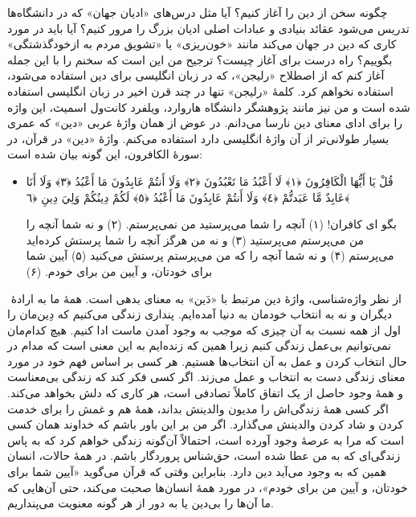 چگونه سخن از دین را آغاز کنیم؟ آیا مثل درس‌های «ادیان جهان» که در دانشگاه‌ها تدریس می‌شود عقائد بنیادی و عبادات اصلی ادیان بزرگ را مرور کنیم؟ آیا باید در مورد کاری که دین در جهان می‌کند مانند «خون‌ریزی» یا «تشویق مردم به ازخودگذشتگی» بگوییم؟ راه درست برای آغاز چیست؟ ترجیح من این است که سخنم را با این جمله آغاز کنم که از اصطلاح «رلیجن»،
که در زبان انگلیسی برای دین استفاده می‌شود، استفاده نخواهم کرد. کلمهٔ «رلیجن» تنها در چند قرن اخیر در زبان انگلیسی استفاده شده است و من نیز مانند پژوهشگر دانشگاه هاروارد، ویلفرد کانت‌ول اسمیث، این واژه را برای ادای معنای دین نارسا می‌دانم. در عوض از همان واژهٔ عربی «دین» که عمری بسیار طولانی‌تر از آن واژهٔ انگلیسی دارد استفاده می‌کنم. واژهٔ «دین» در قرآن، در سورهٔ الکافرون، این گونه بیان شده است:

\begin{itemize}
	\item[]
	
	{
		قُلْ يَا أَيُّهَا الْكَافِرُونَ ﴿١﴾ لَا أَعْبُدُ مَا تَعْبُدُونَ ﴿٢﴾ وَلَا أَنتُمْ عَابِدُونَ مَا أَعْبُدُ ﴿٣﴾ وَلَا أَنَا عَابِدٌ مَّا عَبَدتُّمْ ﴿٤﴾ وَلَا أَنتُمْ عَابِدُونَ مَا أَعْبُدُ ﴿٥﴾ لَكُمْ دِينُكُمْ وَلِيَ دِينِ ﴿٦﴾
	}
	
	{
		بگو ای کافران! (۱) آنچه را شما می‌پرستید من نمی‌پرستم. (۲) و نه شما آنچه را من می‌پرستم می‌پرستید (۳) و نه من هرگز آنچه را شما پرستش کرده‌اید می‌پرستم (۴) و نه شما آنچه را که من می‌پرستم پرستش می‌کنید (۵)  آیین شما برای خودتان، و آیین من برای خودم. (۶)
	}
\end{itemize}
‍‍
از نظر واژه‌شناسی، واژهٔ دین مرتبط با «دَین» به معنای بدهی است. همهٔ ما به ارادهٔ‌ دیگران و نه به انتخاب خودمان به دنیا آمده‌ایم. پنداری زندگی می‌کنیم که دِین‌مان را اول از همه نسبت به آن چیزی که موجب به وجود آمدن ماست ادا کنیم. هیچ کدام‌مان نمی‌توانیم بی‌عمل زندگی کنیم زیرا همین که زنده‌ایم به این معنی است که مدام در حال انتخاب کردن و عمل به آن انتخاب‌ها هستیم. هر کسی بر اساس فهم خود در مورد معنای زندگی دست به انتخاب و عمل می‌زند. اگر کسی فکر کند که زندگی بی‌معناست و همهٔ‌ وجود حاصل از یک اتفاق کاملاً تصادفی است، هر کاری که دلش بخواهد می‌کند. اگر کسی همهٔ زندگی‌اش را مدیون والدینش بداند، همهٔ هم و غمش را برای خدمت کردن و شاد کردن والدینش می‌گذارد. اگر من بر این باور باشم که خداوند همان کسی است که مرا به عرصهٔ وجود آورده است، احتمالاً آن‌گونه زندگی خواهم کرد که به پاس زندگی‌ای که به من عطا شده است، حق‌شناس پروردگار باشم. در همهٔ حالات، انسان همین که به وجود می‌آید دین دارد. بنابراین وقتی که قرآن می‌گوید «آیین شما برای خودتان، و آیین من برای خودم»، در مورد همهٔ انسان‌ها صحبت می‌کند، حتی آن‌هایی که ما آن‌ها را بی‌دین یا به دور از هر گونه معنویت می‌پنداریم.

